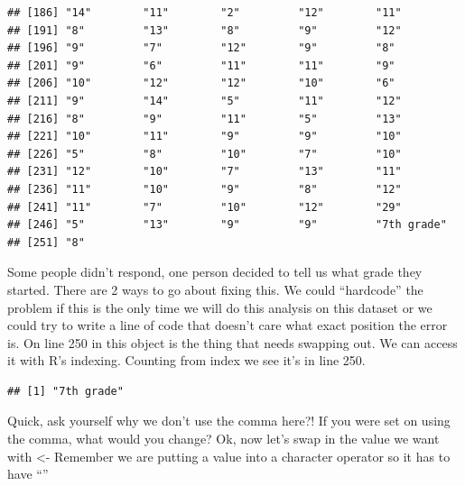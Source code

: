 \documentclass[]{book}
\newenvironment{Shaded}{\begin{snugshade}}{\end{snugshade}}
\newcommand{\DecValTok}[1]{\textcolor[rgb]{0.00,0.00,0.81}{#1}}
\newcommand{\StringTok}[1]{\textcolor[rgb]{0.31,0.60,0.02}{#1}}
\newcommand{\OperatorTok}[1]{\textcolor[rgb]{0.81,0.36,0.00}{\textbf{#1}}}
\newcommand{\NormalTok}[1]{#1}
\theoremstyle{definition}
\theoremstyle{definition}
\theoremstyle{definition}
\theoremstyle{remark}
\begin{document}
\begin{verbatim}
## [186] "14"        "11"        "2"         "12"        "11"       
## [191] "8"         "13"        "8"         "9"         "12"       
## [196] "9"         "7"         "12"        "9"         "8"        
## [201] "9"         "6"         "11"        "11"        "9"        
## [206] "10"        "12"        "12"        "10"        "6"        
## [211] "9"         "14"        "5"         "11"        "12"       
## [216] "8"         "9"         "11"        "5"         "13"       
## [221] "10"        "11"        "9"         "9"         "10"       
## [226] "5"         "8"         "10"        "7"         "10"       
## [231] "12"        "10"        "7"         "13"        "11"       
## [236] "11"        "10"        "9"         "8"         "12"       
## [241] "11"        "7"         "10"        "12"        "29"       
## [246] "5"         "13"        "9"         "9"         "7th grade"
## [251] "8"
\end{verbatim}

Some people didn't respond, one person decided to tell us what grade
they started. There are 2 ways to go about fixing this. We could
``hardcode'' the problem if this is the only time we will do this
analysis on this dataset or we could try to write a line of code that
doesn't care what exact position the error is. On line 250 in this
object is the thing that needs swapping out. We can access it with R's
indexing. Counting from index we see it's in line 250.

\begin{Shaded}
\end{Shaded}

\begin{verbatim}
## [1] "7th grade"
\end{verbatim}

Quick, ask yourself why we don't use the comma here?! If you were set on
using the comma, what would you change? Ok, now let's swap in the value
we want with \textless{}- Remember we are putting a value into a
character operator so it has to have ``''

\begin{Shaded}
\end{Shaded}
\end{document}
